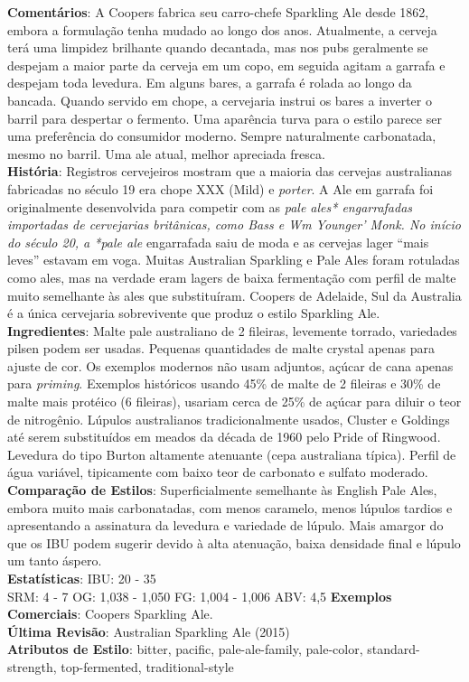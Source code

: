 \textbf{Comentários}: A Coopers fabrica seu carro-chefe Sparkling Ale desde 1862, embora a formulação tenha mudado ao longo dos anos. Atualmente, a cerveja terá uma limpidez brilhante quando decantada, mas nos pubs geralmente se despejam a maior parte da cerveja em um copo, em seguida agitam a garrafa e despejam toda levedura. Em alguns bares, a garrafa é rolada ao longo da bancada. Quando servido em chope, a cervejaria instrui os bares a inverter o barril para despertar o fermento. Uma aparência turva para o estilo parece ser uma preferência do consumidor moderno. Sempre naturalmente carbonatada, mesmo no barril. Uma ale atual, melhor apreciada fresca. \\
\textbf{História}: Registros cervejeiros mostram que a maioria das cervejas australianas fabricadas no século 19 era chope XXX (Mild) e \textit{porter}. A Ale em garrafa foi originalmente desenvolvida para competir com as \textit{pale ales* engarrafadas importadas de cervejarias britânicas, como Bass e Wm Younger' Monk. No início do século 20, a *pale ale} engarrafada saiu de moda e as cervejas lager “mais leves” estavam em voga. Muitas Australian Sparkling e Pale Ales foram rotuladas como ales, mas na verdade eram lagers de baixa fermentação com perfil de malte muito semelhante às ales que substituíram. Coopers de Adelaide, Sul da Australia é a única cervejaria sobrevivente que produz o estilo Sparkling Ale. \\
\textbf{Ingredientes}: Malte pale australiano de 2 fileiras, levemente torrado, variedades pilsen podem ser usadas. Pequenas quantidades de malte crystal apenas para ajuste de cor. Os exemplos modernos não usam adjuntos, açúcar de cana apenas para \textit{priming}. Exemplos históricos usando 45\% de malte de 2 fileiras e 30\% de malte mais protéico (6 fileiras), usariam cerca de 25\% de açúcar para diluir o teor de nitrogênio. Lúpulos australianos tradicionalmente usados, Cluster e Goldings até serem substituídos em meados da década de 1960 pelo Pride of Ringwood. Levedura do tipo Burton altamente atenuante (cepa australiana típica). Perfil de água variável, tipicamente com baixo teor de carbonato e sulfato moderado. \\
\textbf{Comparação de Estilos}: Superficialmente semelhante às English Pale Ales, embora muito mais carbonatadas, com menos caramelo, menos lúpulos tardios e apresentando a assinatura da levedura e variedade de lúpulo. Mais amargor do que os IBU podem sugerir devido à alta atenuação, baixa densidade final e lúpulo um tanto áspero. \\
\textbf{Estatísticas}: IBU: 20 - 35 \\
SRM: 4 - 7
OG: 1,038 - 1,050
FG: 1,004 - 1,006
ABV: 4,5%
\textbf{Exemplos Comerciais}: Coopers Sparkling Ale. \\
\textbf{Última Revisão}: Australian Sparkling Ale (2015) \\
\textbf{Atributos de Estilo}: bitter, pacific, pale-ale-family, pale-color, standard-strength, top-fermented, traditional-style
